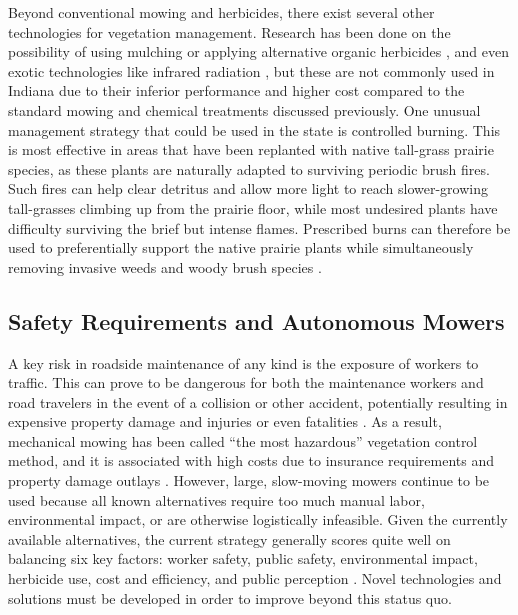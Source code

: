 \documentclass[
]{article}
\begin{document}
Beyond conventional mowing and herbicides, there exist several other
technologies for vegetation management. Research has been done on the
possibility of using mulching or applying alternative organic herbicides
\parencite{Barker_AlternativeManagementRoadside_2009}, and even exotic
technologies like infrared radiation
\parencite{Burnham_NonChemicalMethods_2003}, but these are not commonly
used in Indiana due to their inferior performance and higher cost
compared to the standard mowing and chemical treatments discussed
previously. One unusual management strategy that could be used in the
state is controlled burning. This is most effective in areas that have
been replanted with native tall-grass prairie species, as these plants
are naturally adapted to surviving periodic brush fires. Such fires can
help clear detritus and allow more light to reach slower-growing
tall-grasses climbing up from the prairie floor, while most undesired
plants have difficulty surviving the brief but intense flames.
Prescribed burns can therefore be used to preferentially support the
native prairie plants while simultaneously removing invasive weeds and
woody brush species \parencite{Brandt_IntegratedRoadsideVegetation_2015}.

\subsection{Safety Requirements and Autonomous
Mowers}\label{sec:new_tech}

A key risk in roadside maintenance of any kind is the exposure of
workers to traffic. This can prove to be dangerous for both the
maintenance workers and road travelers in the event of a collision or
other accident, potentially resulting in expensive property damage and
injuries or even fatalities
\parencite{Mardikes_ConstructingDigitalTwin_2025}. As a result,
mechanical mowing has been called ``the most hazardous'' vegetation
control method, and it is associated with high costs due to insurance
requirements and property damage outlays
\parencite{Hyman_BestManagementPractices_1999}. However, large,
slow-moving mowers continue to be used because all known alternatives
require too much manual labor, environmental impact, or are otherwise
logistically infeasible. Given the currently available alternatives, the
current strategy generally scores quite well on balancing six key
factors: worker safety, public safety, environmental impact, herbicide
use, cost and efficiency, and public perception
\parencite{TeeterBalin_FeasibilityAlternativeVegetation_2006}. Novel
technologies and solutions must be developed in order to improve beyond
this status quo.
\end{document}
